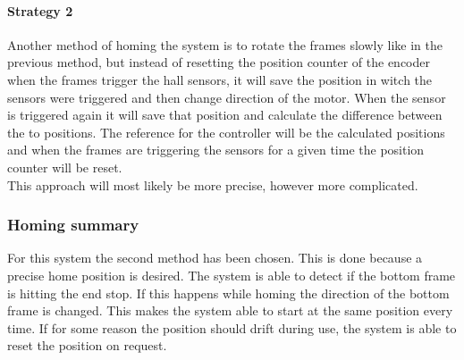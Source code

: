 \documentclass[../../../main]{subfiles}
\begin{document}
\paragraph{Strategy 2}%
\label{par:method_2}
Another method of homing the system is to rotate the frames slowly like in the previous method, but instead of resetting the position counter of the encoder when the frames trigger the hall sensors, it will save the position in witch the sensors were triggered and then change direction of the motor.
When the sensor is triggered again it will save that position and calculate the difference between the to positions.
The reference for the controller will be the calculated positions and when the frames are triggering the sensors for a given time the position counter will be reset.
\\
This approach will most likely be more precise, however more complicated.

\subsubsection{Homing summary}%
\label{ssub:homing_summary}
For this system the second method has been chosen. This is done because a precise home position is desired.
The system is able to detect if the bottom frame is hitting the end stop. If this happens while homing the direction of the bottom frame is changed. 
This makes the system able to start at the same position every time.
If for some reason the position should drift during use, the system is able to reset the position on request.
\end{document}
